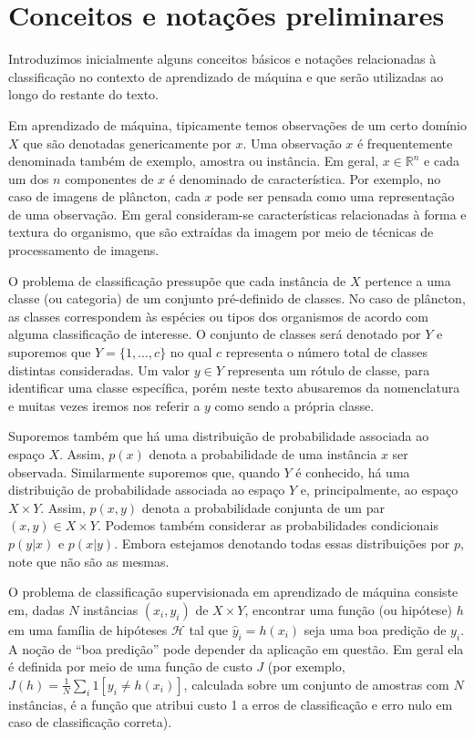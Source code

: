 {\color{blue}
\section{Conceitos e notações preliminares}

Introduzimos inicialmente alguns conceitos básicos e notações relacionadas à classificação no contexto de aprendizado de máquina e que serão utilizadas ao longo do restante do texto.

Em aprendizado de máquina, tipicamente temos observações de um certo domínio $X$ que são denotadas genericamente por $x$. Uma observação $x$ é frequentemente denominada também de exemplo, amostra ou instância. Em geral, $x \in \mathbb{R}^n$ e cada um dos $n$ componentes de $x$ é denominado de característica. Por exemplo, no caso de imagens de plâncton, cada $x$ pode ser pensada como uma representação de uma observação. Em geral consideram-se características relacionadas à forma e textura do organismo, que são extraídas da imagem por meio de técnicas de processamento de imagens.

O problema de classificação pressupõe que cada instância de $X$ pertence a uma classe (ou categoria) de um conjunto pré-definido de classes. No caso de plâncton, as classes correspondem às espécies ou tipos dos organismos de acordo com alguma classificação de interesse. O conjunto de classes será denotado por $Y$ e suporemos que $Y=\{1,\ldots,c\}$ no qual $c$ representa o número total de classes distintas consideradas. Um valor $y \in Y$ representa um rótulo de classe, para identificar uma classe específica, porém neste texto abusaremos da nomenclatura e muitas vezes iremos nos referir a $y$ como sendo a própria classe.

Suporemos também que há uma distribuição de probabilidade associada ao espaço $X$. Assim, $p(x)$ denota a probabilidade de uma instância $x$ ser observada. Similarmente suporemos que, quando $Y$ é conhecido, há uma distribuição de probabilidade associada ao espaço $Y$ e, principalmente, ao espaço $X \times Y$. Assim, $p(x,y)$ denota a probabilidade conjunta de um par $(x,y) \in X \times Y$. Podemos também considerar as probabilidades condicionais $p(y|x)$ e $p(x|y)$. Embora estejamos denotando todas essas distribuições por $p$, note que não são as mesmas.

O problema de classificação supervisionada em aprendizado de máquina consiste em, dadas $N$ instâncias $(x_i,y_i)$ de $X \times Y$, encontrar uma função (ou hipótese) $h$ em uma família de hipóteses $\mathcal{H}$ tal que $\hat{y}_i = h(x_i)$ seja uma boa predição de $y_i$. A noção de ``boa predição'' pode depender da aplicação em questão. Em geral ela é definida por meio de uma função de custo $J$ (por exemplo, $J(h) = \frac{1}{N}\sum_i 1[y_i \neq h(x_i)]$, calculada sobre um conjunto de amostras com $N$ instâncias,  é a função que atribui custo 1 a erros de classificação e erro nulo em caso de classificação correta).

}
